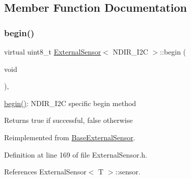 \subsection{Member Function Documentation}
\mbox{\label{classExternalSensor_3_01NDIR__I2C_01_4_ac6f3614d94968ef0cc11b2b4d69cef03}} 
\subsubsection{\texorpdfstring{begin()}{begin()}}
{\footnotesize\ttfamily virtual uint8\+\_\+t \hyperlink{classExternalSensor}{External\+Sensor}$<$ N\+D\+I\+R\+\_\+\+I2C $>$\+::begin (\begin{DoxyParamCaption}\item[{void}]{ }\end{DoxyParamCaption})\hspace{0.3cm}{\ttfamily [inline]}, {\ttfamily [virtual]}}

\hyperlink{classExternalSensor_3_01NDIR__I2C_01_4_ac6f3614d94968ef0cc11b2b4d69cef03}{begin()}\+: N\+D\+I\+R\+\_\+\+I2C specific begin method

\begin{DoxyReturn}{Returns}
true if successful, false otherwise 
\end{DoxyReturn}


Reimplemented from \hyperlink{classBaseExternalSensor_a87d132803d4f4fdd4e66332809f0c9a0}{Base\+External\+Sensor}.



Definition at line 169 of file External\+Sensor.\+h.



References External\+Sensor$<$ T $>$\+::sensor.


